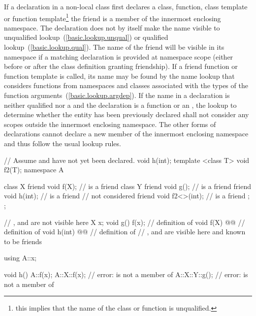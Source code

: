 \pnum
If a  declaration in a non-local class first declares a
class, function, class template or function template\footnote{this implies that the name of the class or function is unqualified.}
the friend is a member of the innermost enclosing
namespace. The  declaration does not by itself make the name
visible to unqualified lookup~(\ref{basic.lookup.unqual}) or qualified
lookup~(\ref{basic.lookup.qual}). \enternote The name of the friend will be
visible in its namespace if a matching declaration is provided at namespace
scope (either before or after the class definition granting friendship).
\exitnote If a friend
function or function template is called, its name may be found by the
name lookup that considers functions from namespaces and classes
associated with the types of the function
arguments~(\ref{basic.lookup.argdep}). If the
name in a  declaration is neither qualified nor a
 and the declaration is a function or an
, the lookup to determine whether
the entity has been previously declared shall not consider any scopes
outside the innermost enclosing namespace. \enternote The other forms of
 declarations cannot declare a new member of the innermost
enclosing namespace and thus follow the usual lookup rules.
\exitnote
\enterexample

\begin{codeblock}
// Assume  and  have not yet been declared.
void h(int);
template <class T> void f2(T);
namespace A {
  class X {
    friend void f(X);           //  is a friend
    class Y {
      friend void g();          //  is a friend
      friend void h(int);       //  is a friend
                                //  not considered
      friend void f2<>(int);    //  is a friend
    };
  };

  // ,  and  are not visible here
  X x;
  void g() { f(x); }            // definition of 
  void f(X) @@       // definition of 
  void h(int) @@    // definition of 
  // ,  and  are visible here and known to be friends
}

using A::x;

void h() {
  A::f(x);
  A::X::f(x);                   // error:  is not a member of 
  A::X::Y::g();                 // error:  is not a member of 
}
\end{codeblock}
\exitexample

